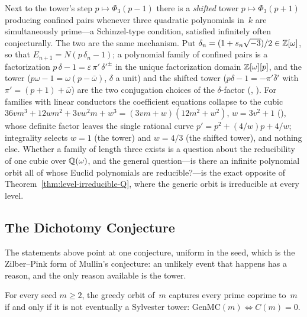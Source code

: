 Next to the tower's step $p \mapsto \Phi_3(p{-}1)$ there is a
\emph{shifted} tower $p \mapsto \Phi_3(p{+}1)$ producing confined pairs
whenever three quadratic polynomials in~$k$ are simultaneously prime---a
Schinzel-type condition, satisfied infinitely often conjecturally.  The
two are the same mechanism.  Put $\delta_n = (1+s_n\sqrt{-3})/2 \in
\mathbb{Z}[\omega]$, so that $E_{n+1} = N(p\,\delta_n - 1)$; a polynomial family of
confined pairs is a factorization $p\,\delta - 1 = \varepsilon\,\pi'\,
\delta'^{\pm}$ in the unique factorization domain $\mathbb{Z}[\omega][p]$, and the
tower ($p\omega - 1 = \omega(p-\bar\omega)$, $\delta$ a unit) and the
shifted tower ($p\delta - 1 = -\pi'\bar\delta'$ with $\pi' = (p{+}1)+
\bar\omega$) are the two conjugation choices of the $\delta$-factor
(,
).
For families with linear conductors the coefficient equations collapse
to the cubic $36vm^3 + 12wm^2 + 3vw^2m + w^3 = (3vm+w)(12m^2+w^2)$, $w =
3v^2+1$ (),
whose definite factor leaves the single rational curve $p' = p^2 + (4/w)p +
4/w$; integrality selects $w = 1$ (the tower) and $w = 4/3$ (the shifted
tower), and nothing else.  Whether a family of length three exists is a
question about the reducibility of one cubic over $\mathbb{Q}(\omega)$, and the
general question---is there an infinite polynomial orbit all of whose
Euclid polynomials are reducible?---is the exact opposite of
Theorem~\ref{thm:level-irreducible-Q}, where the generic orbit is
irreducible at every level.

\subsection{The Dichotomy Conjecture}
\label{sec:dichotomy}

The statements above point at one conjecture, uniform in the seed, which
is the Zilber--Pink form of Mullin's conjecture: an unlikely event that
happens has a reason, and the only reason available is the tower.

\begin{conjecture}
\label{conj:dichotomy}
For every seed $m \geq 2$, the greedy orbit of~$m$ captures every prime
coprime to~$m$ if and only if it is not eventually a Sylvester tower:
$\mathrm{GenMC}(m) \iff C(m) = 0$.
\end{conjecture}

